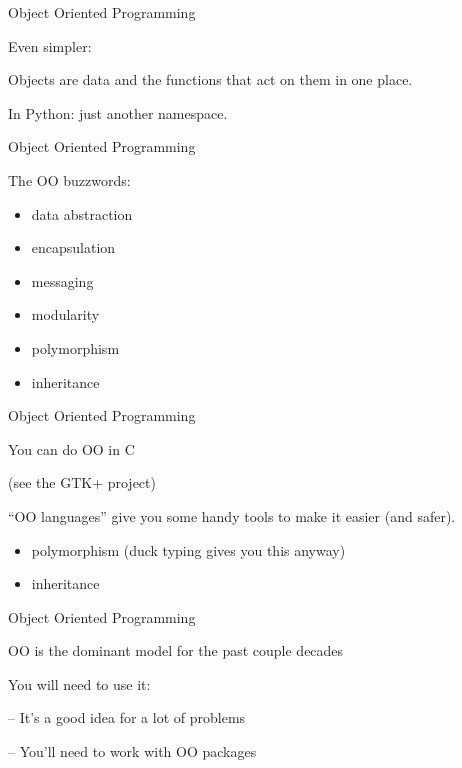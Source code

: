 \documentclass{beamer}
\begin{document}
\begin{frame}[fragile]{Object Oriented Programming}

\vfill
{\LARGE Even simpler:}

\vfill
{\Large 
Objects are data and the functions that act on them in one place.
}

\vfill
{\Large 
In Python: just another namespace.
}
\end{frame} 

\begin{frame}[fragile]{Object Oriented Programming}

\vfill
{\LARGE The OO buzzwords:

\vfill
\begin{itemize}
  \item data abstraction
  \item encapsulation
  \item messaging
  \item modularity
  \item polymorphism
  \item inheritance
\end{itemize}
}
\end{frame} 

\begin{frame}[fragile]{Object Oriented Programming}

\vfill
{\LARGE You can do OO in C}

(see the GTK+ project)

\vfill
{\Large 
``OO languages'' give you some handy tools to make it easier (and safer).
}

\vfill
\begin{itemize}
  \item polymorphism (duck typing gives you this anyway)
  \item inheritance
\end{itemize}

\end{frame} 

\begin{frame}[fragile]{Object Oriented Programming}

\vfill
{\LARGE OO is the dominant model for the past couple decades

\vfill
You will need to use it:

\vfill
-- It's a good idea for a lot of problems

\vfill
-- You'll need to work with OO packages
}
\end{frame} 
\end{document}
